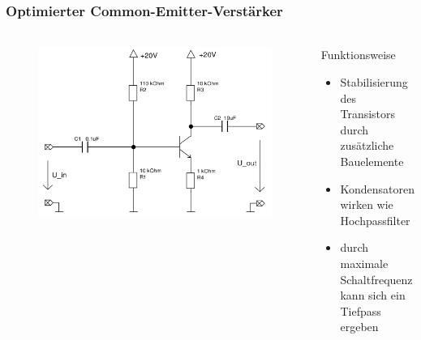\begin{frame}
    \frametitle{Optimierter Common-Emitter-Verstärker}
    \framesubtitle{}
    \begin{columns}[c]
    \begin{figure}[H]
    \begin{center}
            \includegraphics[scale=0.15]{./img/schaltungen/common_emitter_optimiert.png}
    \end{center}
    \end{figure}
    \begin{block}{Funktionsweise}
        \begin{itemize}
            \item Stabilisierung des Transistors durch zusätzliche Bauelemente
            \item Kondensatoren wirken wie Hochpassfilter
            \item durch maximale Schaltfrequenz kann sich ein Tiefpass ergeben
        \end{itemize}     
    \end{block}
    \end{columns}
\end{frame}
